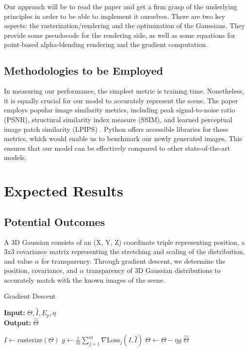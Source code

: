\documentclass[12pt, a4paper, twocolumn]{article}
\begin{document}
Our approach will be to read the paper and get a firm grasp of the underlying principles in order to
be able to implement it ourselves. There are two key aspects: the rasterization/rendering
and the optimization of the Gaussians. They provide some pseudocode for the rendering side,
as well as some equations for point-based alpha-blending rendering and the gradient computation.

\subsection{Methodologies to be Employed}

In measuring our performance, the simplest metric is training time. Nonetheless, it is equally crucial for our model to accurately represent the scene. The paper employs popular image similarity metrics, including peak signal-to-noise ratio (PSNR), structural similarity index measure (SSIM), and learned perceptual image patch similarity (LPIPS) \cite{kerbl20233d}. Python offers accessible libraries for these metrics, which would enable us to benchmark our newly generated images. This ensures that our model can be effectively compared to other state-of-the-art models.

\section{Expected Results}
\subsection{Potential Outcomes}

A 3D Gaussian consists of an (X, Y, Z) coordinate triple representing position, a 3x3 covariance matrix representing the stretching and scaling of the distribution, and value $\alpha$ for transparency. Through gradient descent, we determine the position, covariance, and $\alpha$ transparency of 3D Gaussian distributions to accurately match with the known images of the scene.

\begin{algorithm}
\caption{Gradient Descent}
\hspace*{\algorithmicindent} \textbf{Input:} $\Theta, \hat{I}, E_p, \eta$\\
\hspace*{\algorithmicindent} \textbf{Output:} $\hat{\Theta}$
\begin{algorithmic}[1]

        \State $I \leftarrow \text{rasterize}(\Theta)$
        \State $g \leftarrow \frac{1}{m} \sum_{j=1}^{m} \nabla \text{Loss}_j(I, \hat{I})$
        \State $\Theta \leftarrow \Theta - \eta g$
    \EndFor
    \State \Return $\hat{\Theta}$
\EndProcedure
\end{algorithmic}
\end{algorithm}
\end{document}
